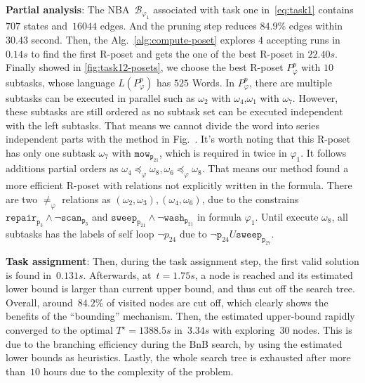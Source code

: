 \textbf{Partial analysis}:
The NBA~$\mathcal{B}_{\varphi_1}$ associated with task one in~\eqref{eq:task1}
contains~$707$ states and~$16044$ edges. And the pruning step reduces $84.9\%$ edges within
$30.43$ second. Then, the Alg.~\ref{alg:compute-poset} explores
 $4$ accepting runs in $0.14s$ to find the first R-poset and gets the one of the best R-poset in $22.40s$.
 Finally showed in \ref{fig:task12-posets}, we choose the best R-poset $P^{p}_{\varphi}$ with $10$ subtasks, whose language
 $L(P^{p}_{\varphi})$ has $525$ {Words}. In $P^{p}_{\varphi}$, there are
 multiple subtasks can be executed in parallel such as $\omega_2 $ with $ \omega_4$,$\omega_1 $ with $ \omega_7$.
 However, these subtasks are still ordered as no subtask set can be executed independent with the left
 subtasks. That means we cannot
 divide the word into series independent parts with the method in Fig.~\citep{schillinger2018simultaneous}.
 It's worth noting that this R-poset has only one subtask $\omega_7$ with $\texttt{mow}_{\texttt{p}_{21}}$,
 which is required in twice in $\varphi_1$. It follows additions partial orders as
 $\omega_4\preceq_\varphi \omega_8,\omega_6\preceq_\varphi \omega_8$. That means our method found
 a more efficient R-poset with relations not explicitly written in the formula.
 There are two $\neq_\varphi$ relations as $(\omega_2,\omega_3),(\omega_4,\omega_6)$, due to the constrains
 $\texttt{repair}_{\texttt{p}_3}\wedge\lnot\texttt{scan}_{\texttt{p}_3} $ and
  $\texttt{sweep}_{\texttt{p}_{21}} \wedge \lnot \texttt{wash}_{\texttt{p}_{21}}$ in formula $\varphi_1$.
  Until execute $\omega_8$, all subtasks has the labels of self loop  $\lnot p_{24}$ due to
   $\lnot \texttt{p}_{24} U \texttt{sweep}_{\texttt{p}_{27}}$.



\textbf{Task assignment}:
Then, during the task assignment step,
the first valid solution is found in~$0.131s$.
Afterwards, at~$t=1.75s$, a node is reached and its estimated lower
bound is larger than current upper bound, and thus cut off the search tree.
Overall, around~$84.2\%$ of visited nodes are cut off,
which clearly shows the benefits of the ``bounding'' mechanism.
Then, the estimated upper-bound rapidly converged
to the optimal $T^\star=1388.5s$ in~$3.34s$ with exploring~$30$ nodes.
This is due to the branching efficiency during the BnB search,
by using the estimated lower bounds as heuristics.
Lastly, the whole search tree is exhausted after more than~$10$ hours
due to the complexity of the problem.


